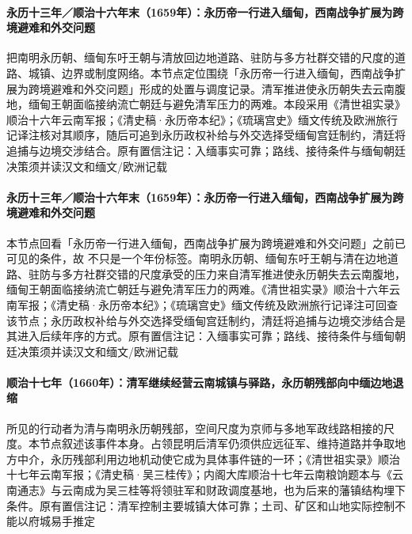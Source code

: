 \paragraph{永历十三年／顺治十六年末（1659年）：永历帝一行进入缅甸，西南战争扩展为跨境避难和外交问题}
 把南明永历朝、缅甸东吁王朝与清放回边地道路、驻防与多方社群交错的尺度的道路、城镇、边界或制度网络。本节点定位围绕「永历帝一行进入缅甸，西南战争扩展为跨境避难和外交问题」形成的处置与调度记录。清军推进使永历朝失去云南腹地，缅甸王朝面临接纳流亡朝廷与避免清军压力的两难。本段采用《清世祖实录》顺治十六年云南军报；《清史稿·永历帝本纪》；《琉璃宫史》缅文传统及欧洲旅行记译注核对其顺序，随后可追到永历政权补给与外交选择受缅甸宫廷制约，清廷将追捕与边境交涉结合。原有置信注记：入缅事实可靠；路线、接待条件与缅甸朝廷决策须并读汉文和缅文/欧洲记载

\paragraph{永历十三年／顺治十六年末（1659年）：永历帝一行进入缅甸，西南战争扩展为跨境避难和外交问题}
本节点回看「永历帝一行进入缅甸，西南战争扩展为跨境避难和外交问题」之前已可见的条件，故 不只是一个年份标签。南明永历朝、缅甸东吁王朝与清在边地道路、驻防与多方社群交错的尺度承受的压力来自清军推进使永历朝失去云南腹地，缅甸王朝面临接纳流亡朝廷与避免清军压力的两难。《清世祖实录》顺治十六年云南军报；《清史稿·永历帝本纪》；《琉璃宫史》缅文传统及欧洲旅行记译注可回查该节点；永历政权补给与外交选择受缅甸宫廷制约，清廷将追捕与边境交涉结合是其进入后续年序的方式。原有置信注记：入缅事实可靠；路线、接待条件与缅甸朝廷决策须并读汉文和缅文/欧洲记载

\paragraph{顺治十七年（1660年）：清军继续经营云南城镇与驿路，永历朝残部向中缅边地退缩}
 所见的行动者为清与南明永历朝残部，空间尺度为京师与多地军政线路相接的尺度。本节点叙述该事件本身。占领昆明后清军仍须供应远征军、维持道路并争取地方中介，永历残部利用边地机动使它成为具体事件链的一环；《清世祖实录》顺治十七年云南军报；《清史稿·吴三桂传》；内阁大库顺治十七年云南粮饷题本与《云南通志》与云南成为吴三桂等将领驻军和财政调度基地，也为后来的藩镇结构埋下条件。原有置信注记：清军控制主要城镇大体可靠；土司、矿区和山地实际控制不能以府城易手推定

